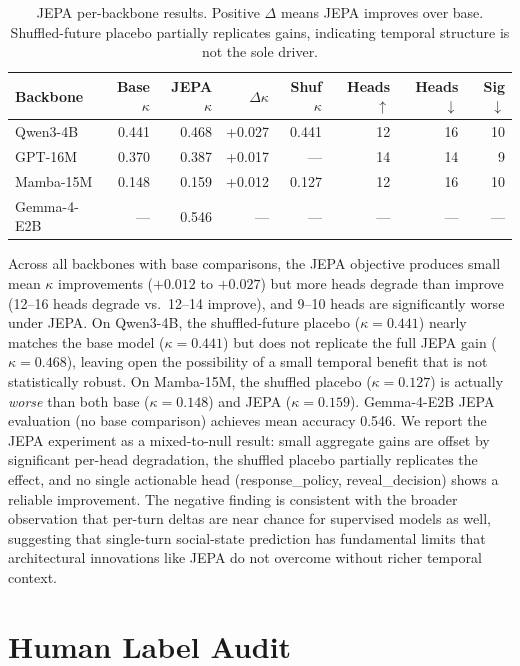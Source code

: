 \documentclass[11pt]{article}
\begin{document}
\begin{table}[h]
\centering
\caption{JEPA per-backbone results. Positive $\Delta$ means JEPA improves over base. Shuffled-future placebo partially replicates gains, indicating temporal structure is not the sole driver.}
\label{tab:jepa_appendix}
\small
\begin{tabular}{@{}lrrrrrrr@{}}
\toprule
\textbf{Backbone} & \textbf{Base $\kappa$} & \textbf{JEPA $\kappa$} & \textbf{$\Delta\kappa$} & \textbf{Shuf $\kappa$} & \textbf{Heads $\uparrow$} & \textbf{Heads $\downarrow$} & \textbf{Sig $\downarrow$} \\
\midrule
Qwen3-4B     & 0.441 & 0.468 & +0.027 & 0.441 & 12 & 16 & 10 \\
GPT-16M      & 0.370 & 0.387 & +0.017 & ---   & 14 & 14 & 9 \\
Mamba-15M    & 0.148 & 0.159 & +0.012 & 0.127 & 12 & 16 & 10 \\
Gemma-4-E2B  & ---   & 0.546 & ---    & ---   & --- & --- & --- \\
\bottomrule
\end{tabular}
\end{table}

Across all backbones with base comparisons, the JEPA objective produces small mean $\kappa$ improvements ($+0.012$ to $+0.027$) but more heads degrade than improve (12--16 heads degrade vs.\ 12--14 improve), and 9--10 heads are significantly worse under JEPA.
On Qwen3-4B, the shuffled-future placebo ($\kappa{=}0.441$) nearly matches the base model ($\kappa{=}0.441$) but does not replicate the full JEPA gain ($\kappa{=}0.468$), leaving open the possibility of a small temporal benefit that is not statistically robust.
On Mamba-15M, the shuffled placebo ($\kappa{=}0.127$) is actually \textit{worse} than both base ($\kappa{=}0.148$) and JEPA ($\kappa{=}0.159$).
Gemma-4-E2B JEPA evaluation (no base comparison) achieves mean accuracy 0.546.
We report the JEPA experiment as a mixed-to-null result: small aggregate gains are offset by significant per-head degradation, the shuffled placebo partially replicates the effect, and no single actionable head (response\_policy, reveal\_decision) shows a reliable improvement.
The negative finding is consistent with the broader observation that per-turn deltas are near chance for supervised models as well, suggesting that single-turn social-state prediction has fundamental limits that architectural innovations like JEPA do not overcome without richer temporal context.

\section{Human Label Audit}
\label{app:human_audit}
\end{document}
